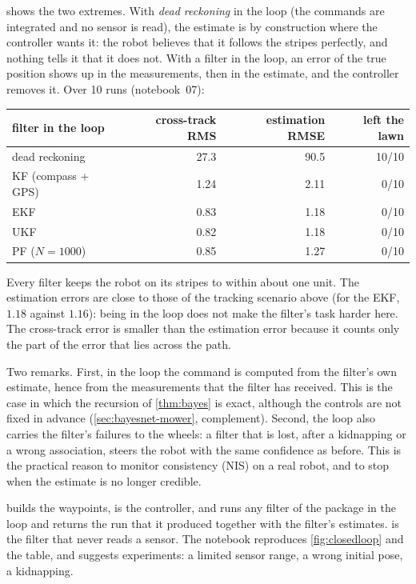  shows the two extremes. With \emph{dead reckoning}
in the loop (the commands are integrated and no sensor is read), the
estimate is by construction where the controller wants it: the robot
believes that it follows the stripes perfectly, and nothing tells it that
it does not. With a filter in the loop, an error of the true position
shows up in the measurements, then in the estimate, and the controller
removes it. Over 10 runs (notebook~07):
\begin{center}
\begin{tabular}{@{}lrrr@{}}
\toprule
filter in the loop & cross-track RMS & estimation RMSE & left the lawn\\
\midrule
dead reckoning & 27.3 & 90.5 & 10/10\\
KF (compass + GPS) & 1.24 & 2.11 & 0/10\\
EKF & 0.83 & 1.18 & 0/10\\
UKF & 0.82 & 1.18 & 0/10\\
PF ($N=1000$) & 0.85 & 1.27 & 0/10\\
\bottomrule
\end{tabular}
\end{center}
Every filter keeps the robot on its stripes to within about one unit. The
estimation errors are close to those of the tracking scenario above (for
the EKF, $1.18$ against $1.16$): being in the loop does not make the filter's task
harder here. The cross-track error is smaller than the estimation error
because it counts only the part of the error that lies across the path.

Two remarks. First, in the loop the command is computed from the filter's
own estimate, hence from the measurements that the filter has received.
This is the case in which the recursion of \cref{thm:bayes} is exact,
although the controls are not fixed in advance (\cref{sec:bayesnet-mower},
complement). Second, the loop also carries the filter's failures to the
wheels: a filter that is lost, after a kidnapping or a wrong association,
steers the robot with the same confidence as before. This is the practical
reason to monitor consistency (NIS) on a real robot, and to stop when the
estimate is no longer credible.

\begin{practice}
 builds the waypoints,  is the
controller, and  runs any filter of the
package in the loop and returns the run that it produced together with the
filter's estimates.  is the filter that never reads a
sensor. The notebook reproduces \cref{fig:closedloop} and the table, and
suggests experiments: a limited sensor range, a wrong initial pose, a
kidnapping.
\end{practice}

